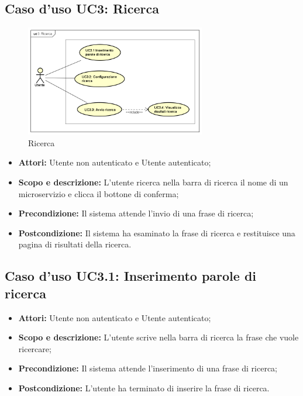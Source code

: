 \documentclass[12pt,a4paper,titlepage]{article}
\begin{document}
\subsection{Caso d'uso UC3: Ricerca}
\begin{figure}[H]
	\centering
	\includegraphics[width=0.7\textwidth]{UseCase/Ricerca}
	\caption{Ricerca}
\end{figure}
\begin{itemize}
	\item \textbf{Attori: }Utente non autenticato e Utente autenticato;
	\item \textbf{Scopo e descrizione: }L'utente ricerca nella barra di ricerca il nome di un microservizio e clicca il bottone di conferma;
	\item \textbf{Precondizione: }Il sistema attende l'invio di una frase di ricerca;
	\item \textbf{Postcondizione: }Il sistema ha esaminato la frase di ricerca e restituisce una pagina di risultati della ricerca.
\end{itemize}
\subsection{Caso d'uso UC3.1: Inserimento parole di ricerca}
\begin{itemize}
	\item \textbf{Attori: }Utente non autenticato e Utente autenticato;
	\item \textbf{Scopo e descrizione: }L'utente scrive nella barra di ricerca la frase che vuole ricercare;
	\item \textbf{Precondizione: }Il sistema attende l'inserimento di una frase di ricerca;
	\item \textbf{Postcondizione: }L'utente ha terminato di inserire la frase di ricerca.
\end{itemize}
\end{document}
